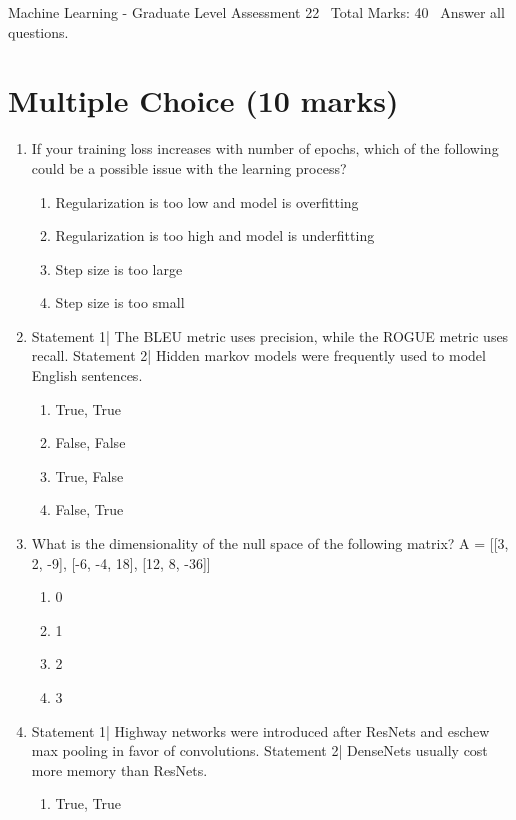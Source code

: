 \documentclass[12pt]{article}
\begin{document}
\begin{center}
Machine Learning - Graduate Level Assessment 22 \
Total Marks: 40 \
Answer all questions.
\end{center}

\section*{Multiple Choice (10 marks)}
\begin{enumerate}[label=\arabic*.]
\item If your training loss increases with number of epochs, which of the following could be a possible issue with the learning process?
\begin{enumerate}[label=(\alph*)]
    \item Regularization is too low and model is overfitting
    \item Regularization is too high and model is underfitting
    \item Step size is too large
    \item Step size is too small
\end{enumerate}
\item Statement 1| The BLEU metric uses precision, while the ROGUE metric uses recall. Statement 2| Hidden markov models were frequently used to model English sentences.
\begin{enumerate}[label=(\alph*)]
    \item True, True
    \item False, False
    \item True, False
    \item False, True
\end{enumerate}
\item What is the dimensionality of the null space of the following matrix? A = [[3, 2, -9], [-6, -4, 18], [12, 8, -36]]
\begin{enumerate}[label=(\alph*)]
    \item 0
    \item 1
    \item 2
    \item 3
\end{enumerate}
\item Statement 1| Highway networks were introduced after ResNets and eschew max pooling in favor of convolutions. Statement 2| DenseNets usually cost more memory than ResNets.
\begin{enumerate}[label=(\alph*)]
    \item True, True

\end{enumerate}
\end{enumerate}
\end{document}
